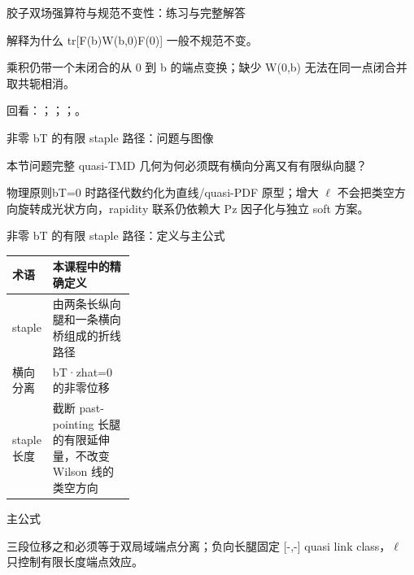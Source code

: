 \begin{frame}[t]{胶子双场强算符与规范不变性：练习与完整解答}
\footnotesize
\begin{block}{}解释为什么 tr[F(b)W(b,0)F(0)] 一般不规范不变。\end{block}
\begin{exampleblock}{}乘积仍带一个未闭合的从 0 到 b 的端点变换；缺少 W(0,b) 无法在同一点闭合并取共轭相消。\end{exampleblock}
\vfill
\scriptsize 回看：；；；。
\end{frame}

\begin{frame}[t]{非零 bT 的有限 staple 路径：问题与图像}
\footnotesize
\begin{block}{本节问题}完整 quasi-TMD 几何为何必须既有横向分离又有有限纵向腿？\end{block}
\begin{block}{物理原则}\quad bT=0 时路径代数约化为直线/\allowbreak{}quasi-PDF 原型；增大 \ensuremath{\ell} 不会把类空方向旋转成光状方向，rapidity 联系仍依赖大 Pz 因子化与独立 soft 方案。\end{block}
\end{frame}

\begin{frame}[t]{非零 bT 的有限 staple 路径：定义与主公式}
\footnotesize\begin{tabularx}{\linewidth}{p{0.30\linewidth}Y}
\toprule 术语 & 本课程中的精确定义\\\midrule
{} staple & 由两条长纵向腿和一条横向桥组成的折线路径\\
 横向分离 & bT·zhat=0 的非零位移\\
 staple 长度 & 截断 past-pointing 长腿的有限延伸量，不改变 Wilson 线的类空方向\\
\bottomrule\end{tabularx}\vspace{0.15cm}
\begin{block}{ 主公式}\centering{}\end{block}
三段位移之和必须等于双局域端点分离；负向长腿固定 [-,-] quasi link class，\ensuremath{\ell} 只控制有限长度端点效应。
\end{frame}

